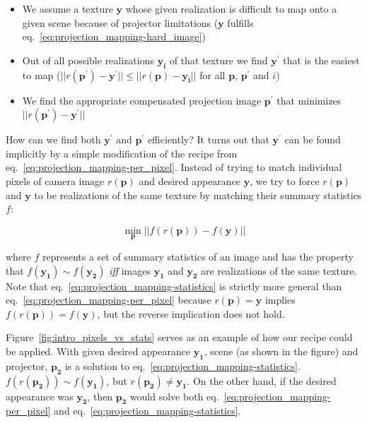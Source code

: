 \begin{itemize}
    \item We assume a texture \(\bm{y}\) whose given realization is difficult to map onto a given scene because of projector limitations (\(\bm{y}\) fulfills eq.~\ref{eq:projection_mapping-hard_image}) %
    \item Out of all possible realizations \(\bm{y_i}\) of that texture we find \(\bm{y^\prime}\) that is the easiest to map (\(||r(\bm{p^\prime}) - \bm{y^\prime}|| \leq ||r(\bm{p}) - \bm{y_i}||\) for all \(\bm{p}\), \(\bm{p^\prime}\) and \(i\))
    \item We find the appropriate compensated projection image \(\bm{p^\prime}\) that minimizes \(||r(\bm{p^\prime}) - \bm{y^\prime}||\)
\end{itemize}

How can we find both \(\bm{y^\prime}\) and \(\bm{p^\prime}\) efficiently? It turns out that \(\bm{y^\prime}\) can be found implicitly by a simple modification of the recipe from eq.~\ref{eq:projection_mapping-per_pixel}. Instead of trying to match individual pixels of camera image \(r(\bm{p})\) and desired appearance \(\bm{y}\), we try to force \(r(\bm{p})\) and \(\bm{y}\) to be realizations of the same texture by matching their summary statistics \(f\):

\begin{equation}
    \label{eq:projection_mapping-statistics}
    \min_{\bm{p}} || f(r(\bm{p})) - f(\bm{y}) ||
\end{equation}

where \(f\) represents a set of summary statistics of an image and has the property that \(f(\bm{y_1}) \sim f(\bm{y_2})\) \textit{iff} images \(\bm{y_1}\) and \(\bm{y_2}\) are realizations of the same texture. Note that eq.~\ref{eq:projection_mapping-statistics} is strictly more general than eq.~\ref{eq:projection_mapping-per_pixel} because \(r(\bm{p}) = \bm{y}\) implies \(f(r(\bm{p})) = f(\bm{y})\), but the reverse implication does not hold.

Figure~\ref{fig:intro_pixels_vs_stats} serves as an example of how our recipe could be applied. With given desired appearance \(\bm{y_1}\), scene (as shown in the figure) and projector, \(\bm{p_2}\) is a solution to eq.~\ref{eq:projection_mapping-statistics}. \(f(r(\bm{p_2})) \sim f(\bm{y_1})\), but \(r(\bm{p_2}) \neq \bm{y_1}\). On the other hand, if the desired appearance was \(\bm{y_2}\), then \(\bm{p_2}\) would solve both eq.~\ref{eq:projection_mapping-per_pixel} and eq.~\ref{eq:projection_mapping-statistics}.

